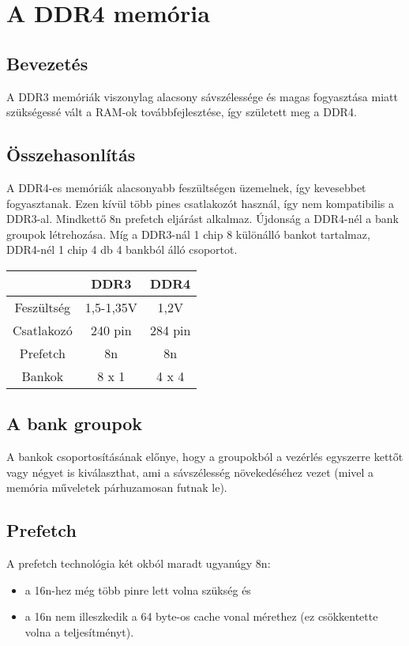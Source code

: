 
\chapter{A DDR4 memória}

\section{Bevezetés}
A DDR3 memóriák viszonylag alacsony sávszélessége és magas fogyasztása miatt szükségessé vált a RAM-ok továbbfejlesztése, így született meg a DDR4.

\section{Összehasonlítás}
A DDR4-es memóriák alacsonyabb feszültségen üzemelnek, így kevesebbet fogyasztanak.
Ezen kívül több pines csatlakozót használ, így nem kompatibilis a DDR3-al.
Mindkettő 8n prefetch eljárást alkalmaz.
Újdonság a DDR4-nél a bank groupok létrehozása.
Míg a DDR3-nál 1 chip 8 különálló bankot tartalmaz, DDR4-nél 1 chip 4 db 4 bankból álló csoportot.
\begin{center}
    \begin{tabular}{c | c | c}
            & DDR3 & DDR4 \\
        \hline
        Feszültség & 1,5-1,35V & 1,2V \\
        \hline
        Csatlakozó & 240 pin & 284 pin \\
        \hline
        Prefetch & 8n & 8n \\
        \hline
        Bankok & 8 x 1 & 4 x 4 \\
    \end{tabular}
\end{center}

\section{A bank groupok}
A bankok csoportosításának előnye, hogy a groupokból a vezérlés egyszerre kettőt vagy négyet is kiválaszthat, ami a sávszélesség növekedéséhez vezet (mivel a memória műveletek párhuzamosan futnak le).

\section{Prefetch}
A prefetch technológia két okból maradt ugyanúgy 8n:
\begin{itemize}
    \item a 16n-hez még több pinre lett volna szükség és
    \item a 16n nem illeszkedik a 64 byte-os cache vonal mérethez (ez csökkentette volna a teljesítményt).
\end{itemize}

